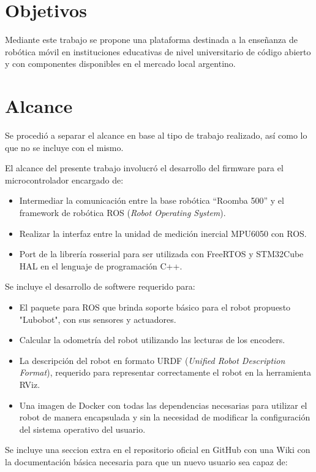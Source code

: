 \section{Objetivos}

Mediante este trabajo se propone una plataforma destinada a la enseñanza de robótica móvil en instituciones educativas de nivel universitario de código abierto y con componentes disponibles en el mercado local argentino.

\section{Alcance}

Se procedió a separar el alcance en base al tipo de trabajo realizado, así como lo que no se incluye con el mismo.

El alcance del presente trabajo involucró el desarrollo del firmware para el microcontrolador encargado de:
\begin{itemize}
	\item Intermediar la comunicación entre la base robótica ``Roomba 500'' y el framework de robótica ROS (\textit{Robot Operating System}).
	\item Realizar la interfaz entre la unidad de medición inercial MPU6050 con ROS.
	\item Port de la librería rosserial para ser utilizada con FreeRTOS y STM32Cube HAL en el lenguaje de programación C++.
\end{itemize}

Se incluye el desarrollo de softwere requerido para:
\begin{itemize}
	\item El paquete para ROS que brinda soporte básico para el robot propuesto "Lubobot", con sus sensores y actuadores.
	\item Calcular la odometría del robot utilizando las lecturas de los encoders.
	\item La descripción del robot en formato URDF (\textit{Unified Robot Description Format}), requerido para representar correctamente el robot en la herramienta RViz.
	\item Una imagen de Docker con todas las dependencias necesarias para utilizar el robot de manera encapsulada y sin la necesidad de modificar la configuración del sistema operativo del usuario.
\end{itemize}

Se incluye una seccion extra en el repositorio oficial en GitHub con una Wiki con la documentación básica necesaria para que un nuevo usuario sea capaz de:

